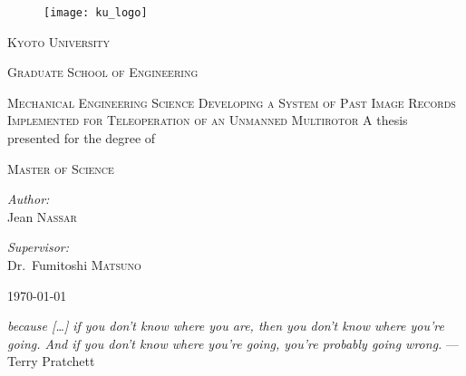 \begin{titlepage}
  \begin{center}
    \noindent

    \begin{figure}[h]
      \centering
      \texttt{[image: ku\_logo]}
    \end{figure}
    \textsc{\LARGE Kyoto University}
    
    \textsc{\Large Graduate School of Engineering}

    \textsc{\large Mechanical Engineering Science}
    \vfill\vfill
    \textsc{\large Developing a System of Past Image Records Implemented for Teleoperation of an Unmanned Multirotor}  %
    \vfill\vfill
    {\large A thesis presented for the degree of}

    \textsc{\large Master of Science}
    \vfill\vfill
    \begin{minipage}[t]{0.4\textwidth}
      \begin{flushleft}
	\emph{Author:}\\
	Jean \textsc{Nassar}
      \end{flushleft}
    \end{minipage}
    \begin{minipage}[t]{0.4\textwidth}
      \begin{flushright}
	\emph{Supervisor:}\\
	Dr.~Fumitoshi \textsc{Matsuno}
      \end{flushright}
    \end{minipage}
    \vfill
    \today
  \end{center}
\end{titlepage}

\thispagestyle{empty}
  \null{}
    \begin{flushright}
      \emph{
	because [\ldots] if you don’t know where you are, then you don’t know where you’re going.
	And if you don’t know where you’re going, you’re probably going wrong.
      } --- Terry Pratchett
    \end{flushright}
  \null


